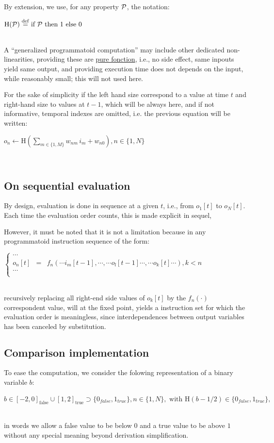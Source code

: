 \documentclass[a4]{article} \usepackage[left=2cm,right=3cm,top=1cm,bottom=2cm]{geometry}
\newcommand{\eqline}[1]{~\vspace{0.1cm}\\\centerline{$#1$}\vspace{0.1cm}\\}
\newcommand{\defq}{\stackrel {\rm def}{=}}
\begin{document}
By extension, we use,  for any property ${\cal P}$, the notation:
\eqline{\mbox{H}({\cal P}) \defq \mbox{if } {\cal P} \mbox{ then } 1 \mbox{ else } 0}

A ``generalized programmatoid computation'' may include other dedicated non-linearities, providing these are \href{https://en.wikipedia.org/wiki/Pure_function}{pure fonction}, i.e., no side effect, same inpouts yield same output, and providing execution time does not depends on the input, while reasonably small; this will not used here.

For the sake of simplicity if the left hand size correspond to a value at time $t$ and right-hand size to values at $t-1$, which will be always here, and if not informative, temporal indexes are omitted, i.e. the previous equation will be written: 
\eqline{o_n  \leftarrow \mbox{H}(\sum_{m\in\{1,M\}} w_{nm} \, i_m + w_{n0}), n \in \{1, N\}}

\subsection{On sequential evaluation}

By design, evaluation is done in sequence at a given $t$, i.e., from $o_1[t]$ to $o_N[t]$. Each time the evaluation order counts, this is made explicit in sequel,

However, it must be noted that it is not a limitation because in any programmatoid instruction sequence of the form:
\eqline{\left\{ \begin{array}{rcl} \cdots \\ o_n[t] &=& f_n\left(\cdots i_m[t-1], \cdots, \cdots o_l[t - 1]  \cdots, \cdots o_k[t]  \cdots  \right), k < n \\ \cdots \\ \end{array} \right.}
recursively replacing all right-end side values of $o_k[t]$ by the $ f_n\left(\cdot\right)$ correspondent value, will at the fixed point, yields a instruction set for which the evaluation order is meaningless, since interdependences between output variables has been canceled by substitution.

\subsection{Comparison implementation}
To ease the computation, we consider the folowing representation of a binary variable $b$:
\eqline{b \in [-2, 0]_{\mbox{false}} \cup [1, 2]_{\mbox{true}} \supset \{0_{{false}}, 1_{{true}}\}, n \in \{1, N\}, \mbox{ with } \mbox{H}(b - 1/2) \in \{0_{{false}}, 1_{{true}}\},}
in words we allow a false value to be below $0$ and a true value to be above $1$ without any special meaning beyond derivation simplification.
\end{document}

